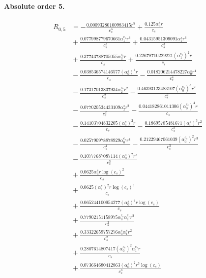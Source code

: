 \documentclass[10pt]{article}
\begin{document}
\paragraph{Absolute order 5.}
\begin{align*}
R_{0,5} &=  - \frac{0.00093280100983415 r^{5}}{c_{s}^{5}} + \frac{0.125 \alpha_{3}^s r}{c_{s}} \\
&{}  + \frac{0.077998779670661 \alpha_{1}^{c_s} r^{3}}{c_{s}^{3}} + \frac{0.04315951309091 \alpha_{1}^s r^{3}}{c_{s}^{3}} \\
&{}  + \frac{0.37743788705055 \alpha_{3}^{c_s} r}{c_{s}} + \frac{0.22678710229221 \left(\alpha_{1}^{c_s}\right)^{2} r}{c_{s}} \\
&{}  - \frac{0.038536574146577 \left(\alpha_{0}^s\right)^{4} r}{c_{s}} - \frac{0.018206214478227 \alpha_{0}^s r^{4}}{c_{s}^{4}} \\
&{}  - \frac{0.17317013837934 \alpha_{2}^{c_s} r^{2}}{c_{s}^{2}} - \frac{0.46393123483107 \left(\alpha_{0}^{c_s}\right)^{3} r^{2}}{c_{s}^{2}} \\
&{}  - \frac{0.077020534433109 \alpha_{2}^s r^{2}}{c_{s}^{2}} - \frac{0.044182861011306 \left(\alpha_{0}^{c_s}\right)^{4} r}{c_{s}} \\
&{}  - \frac{0.14103704832205 \left(\alpha_{1}^s\right)^{2} r}{c_{s}} - \frac{0.18695785481671 \left(\alpha_{0}^s\right)^{3} r^{2}}{c_{s}^{2}} \\
&{}  - \frac{0.025790978878929 \alpha_{0}^{c_s} r^{4}}{c_{s}^{4}} - \frac{0.21229467061039 \left(\alpha_{0}^{c_s}\right)^{2} r^{3}}{c_{s}^{3}} \\
&{}  - \frac{0.10777687087114 \left(\alpha_{0}^s\right)^{2} r^{3}}{c_{s}^{3}} \\
&{}  + \frac{0.0625 \alpha_{3}^s r \log{\left(c_{s} \right)}^{2}}{c_{s}} \\
&{}  + \frac{0.0625 \left(\alpha_{1}^s\right)^{2} r \log{\left(c_{s} \right)}^{3}}{c_{s}} \\
&{}  + \frac{0.065244100954277 \left(\alpha_{0}^s\right)^{4} r \log{\left(c_{s} \right)}}{c_{s}} \\
&{}  + \frac{0.77902151158975 \alpha_{0}^{c_s} \alpha_{1}^{c_s} r^{2}}{c_{s}^{2}} \\
&{}  + \frac{0.33322659757276 \alpha_{0}^s \alpha_{1}^s r^{2}}{c_{s}^{2}} \\
&{}  + \frac{0.2807614807417 \left(\alpha_{0}^{c_s}\right)^{2} \alpha_{1}^{c_s} r}{c_{s}} \\
&{}  + \frac{0.073664680412863 \left(\alpha_{0}^s\right)^{2} r^{3} \log{\left(c_{s} \right)}}{c_{s}^{3}} \\

\end{align*}
\end{document}
